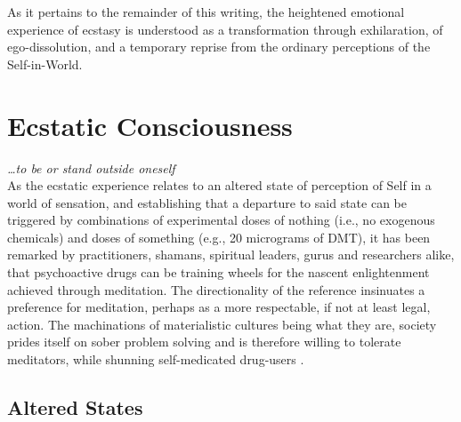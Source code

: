 \documentclass{UIdahoMastersThesis}
\begin{document}
As it pertains to the remainder of this writing, the heightened emotional experience of ecstasy is understood as a transformation through exhilaration, of ego-dissolution, and a temporary reprise from the ordinary perceptions of the Self-in-World.

\clearpage


\chapter{Ecstatic Consciousness}
\noindent
{%
\setlength{\fboxsep}{0pt}%
\setlength{\fboxrule}{1.5pt}%
%
}%
\label{Chapter:EcstaticConsciousness}

\emph{\ldots to be or stand outside oneself}\\

As the ecstatic experience relates to an altered state of perception of Self in a world of sensation, and establishing that a departure to said state can be triggered by combinations of experimental doses of nothing (i.e., no exogenous chemicals) and doses of something (e.g., 20 micrograms of DMT), it has been remarked by practitioners, shamans, spiritual leaders, gurus and researchers alike, that psychoactive drugs can be training wheels for the nascent enlightenment achieved through meditation. The directionality of the reference insinuates a preference for meditation, perhaps as a more respectable, if not at least legal, action. The machinations of materialistic cultures being what they are, society prides itself on sober problem solving and is therefore willing to tolerate meditators, while shunning self-medicated drug-users \cite{noauthor_war_nodate}.

\section{Altered States}
\end{document}
